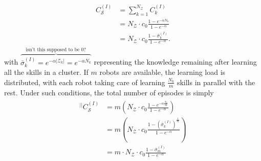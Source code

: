%
\begin{align}\label{eq:complexity_incremental_single}
	\begin{split}
		C_\mathcal{S}^{(I)} &= \sum_{k=1}^{N_\mathcal{Z}} C^{(I)}_k\\
		&= N_\mathcal{Z} \cdot c_0 \frac{1 - e^{-\alpha N_k}}{1 - e^{-\alpha}}\\ 
		&= N_\mathcal{Z} \cdot c_0 \frac{1 - \bar{\sigma}_k^{(I)}}{1 - e^{-\alpha}}.
	\end{split}
\end{align}
with $ \overbrace{\bar{\sigma}^{(I)}_k = e^{- \alpha\lvert  \mathcal{Z}_k \rvert} = e^{-\alpha N_k}}^{\text{isn't this supposed to be 0?}} $ representing the knowledge remaining after learning all the skills in a cluster. If $ m $ robots are available, the learning load is distributed, with each robot taking care of learning $ \frac{N_k}{m} $ skills in parallel with the rest. Under such conditions, the total number of episodes is simply
\begin{align}\label{eq:complexity_incremental_parallel}
	\begin{split}
		{}^{\lvert \rvert}C_\mathcal{S}^{(I)} &= m \left( N_\mathcal{Z} \cdot c_0 \frac{1 - e^{-\alpha \frac{N_k}{m}}}{1 - e^{-\alpha}}\right) \\&= m \left( N_\mathcal{Z} \cdot c_0 \frac{1 - \left(\bar{\sigma}^{(I)}_k\right)^{\frac{1}{m}} }{1 - e^{-\alpha}} \right) \\
		&= m \cdot N_\mathcal{Z} \cdot c_0 \frac{1 - \bar{\sigma}^{(I)}_m}{1 - e^{-\alpha}} 	
	\end{split}	
\end{align}
